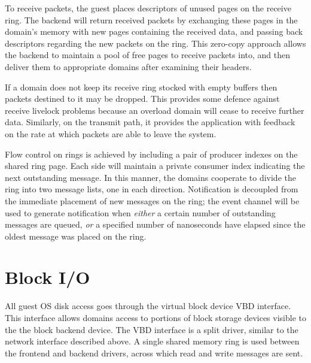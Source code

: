 To receive packets, the guest places descriptors of unused pages on
the receive ring.  The backend will return received packets by
exchanging these pages in the domain's memory with new pages
containing the received data, and passing back descriptors regarding
the new packets on the ring.  This zero-copy approach allows the
backend to maintain a pool of free pages to receive packets into, and
then deliver them to appropriate domains after examining their
headers.


If a domain does not keep its receive ring stocked with empty buffers
then packets destined to it may be dropped.  This provides some
defence against receive livelock problems because an overload domain
will cease to receive further data.  Similarly, on the transmit path,
it provides the application with feedback on the rate at which packets
are able to leave the system.

Flow control on rings is achieved by including a pair of producer
indexes on the shared ring page.  Each side will maintain a private
consumer index indicating the next outstanding message.  In this
manner, the domains cooperate to divide the ring into two message
lists, one in each direction.  Notification is decoupled from the
immediate placement of new messages on the ring; the event channel
will be used to generate notification when {\em either} a certain
number of outstanding messages are queued, {\em or} a specified number
of nanoseconds have elapsed since the oldest message was placed on the
ring.



\section{Block I/O}

All guest OS disk access goes through the virtual block device VBD
interface.  This interface allows domains access to portions of block
storage devices visible to the the block backend device.  The VBD
interface is a split driver, similar to the network interface
described above.  A single shared memory ring is used between the
frontend and backend drivers, across which read and write messages are
sent.


